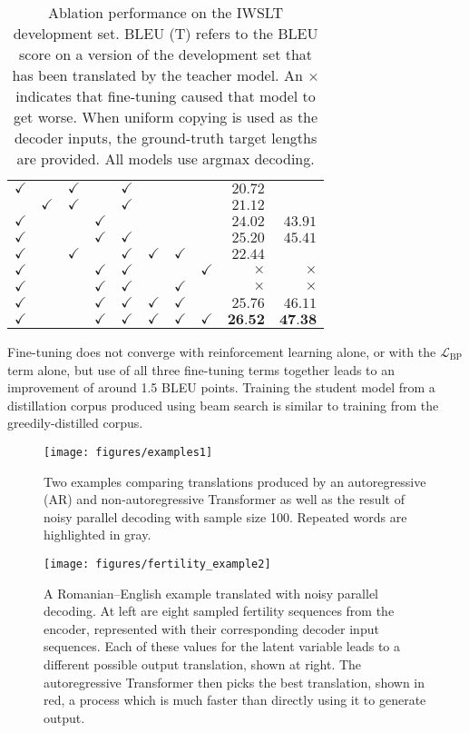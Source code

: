 \documentclass{article} \usepackage{iclr2018_conference,times}
\begin{document}
\begin{table}[h!]
\begin{tabular}{cc|ccc|ccc|rr}
$\checkmark$&  & $\checkmark$ &              & $\checkmark$  & & & & $20.72$\\
&  $\checkmark$& $\checkmark$ &              & $\checkmark$  & & & & $21.12$ \\
$\checkmark$&  &              & $\checkmark$ &               & & & & $24.02$ & $43.91$ \\
$\checkmark$&  &              & $\checkmark$ & $\checkmark$  & & & & $25.20$ & $45.41$ \\
\midrule
$\checkmark$&  & $\checkmark$ &  & $\checkmark$& $\checkmark$ & $\checkmark$ & & $22.44$ \\
$\checkmark$&  &              & $\checkmark$ & $\checkmark$  & & & $\checkmark$ & $\times$ & $\times$\\
$\checkmark$&  &              & $\checkmark$ & $\checkmark$  & & $\checkmark$ & & $\times$ & $\times$\\
$\checkmark$&  &              & $\checkmark$ & $\checkmark$  & $\checkmark$ & $\checkmark$ &  & $25.76$ & $46.11$\\
$\checkmark$&  &              & $\checkmark$ & $\checkmark$  & $\checkmark$ & $\checkmark$ & $\checkmark$ & $ \textbf{26.52}$ & $\textbf{47.38}$\\
\bottomrule
\end{tabular}
\caption{Ablation performance on the IWSLT development set. BLEU (T) refers to the BLEU score on a version of the development set that has been translated by the teacher model. An $\times$ indicates that fine-tuning caused that model to get worse. When uniform copying is used as the decoder inputs, the ground-truth target lengths are provided. All models use argmax decoding.}
\end{table}

Fine-tuning does not converge with reinforcement learning alone, or with the $\mathcal{L}_\text{BP}$ term alone, but use of all three fine-tuning terms together leads to an improvement of around 1.5 BLEU points. Training the student model from a distillation corpus produced using beam search is similar to training from the greedily-distilled corpus.

\begin{figure}[htpb]
\texttt{[image: figures/examples1]}
\caption{\label{fig.ex} Two examples comparing translations produced by an autoregressive (AR) and non-autoregressive Transformer as well as the result of noisy parallel decoding with sample size 100. Repeated words are highlighted in gray.}
\end{figure}
\begin{figure}[htpb]
\centering
\texttt{[image: figures/fertility\_example2]}
\caption{\label{fig.fer} A Romanian--English example translated with noisy parallel decoding. At left are eight sampled fertility sequences from the encoder, represented with their corresponding decoder input sequences. Each of these values for the latent variable leads to a different possible output translation, shown at right. The autoregressive Transformer then picks the best translation, shown in red, a process which is much faster than directly using it to generate output.}
\end{figure}
\end{document}
